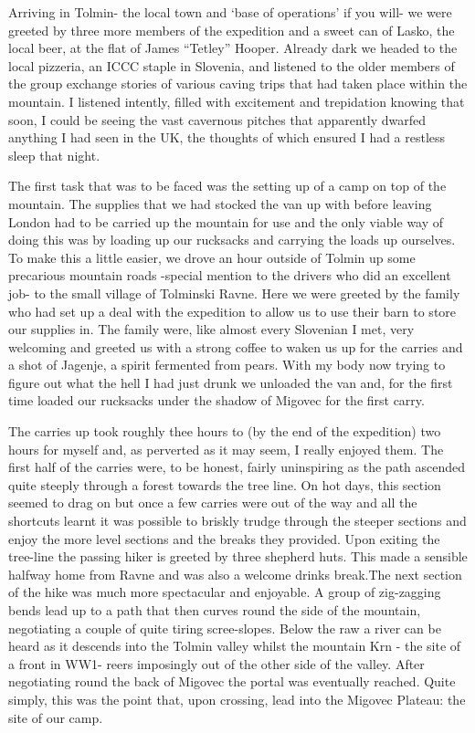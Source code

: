 Arriving in Tolmin- the local town and `base of operations' if you will-
we were greeted by three more members of the expedition and a sweet can
of Lasko, the local beer, at the flat of James ``Tetley'' Hooper.
Already dark we headed to the local pizzeria, an ICCC staple in
Slovenia, and listened to the older members of the group exchange
stories of various caving trips that had taken place within the
mountain. I listened intently, filled with excitement and trepidation
knowing that soon, I could be seeing the vast cavernous pitches that
apparently dwarfed anything I had seen in the UK, the thoughts of which
ensured I had a restless sleep that night.

The first task that was to be faced was the setting up of a camp on top
of the mountain. The supplies that we had stocked the van up with before
leaving London had to be carried up the mountain for use and the only
viable way of doing this was by loading up our rucksacks and carrying
the loads up ourselves. To make this a little easier, we drove an hour
outside of Tolmin up some precarious mountain roads -special mention to
the drivers who did an excellent job- to the small village of Tolminski
Ravne. Here we were greeted by the family who had set up a deal with the
expedition to allow us to use their barn to store our supplies in. The
family were, like almost every Slovenian I met, very welcoming and
greeted us with a strong coffee to waken us up for the carries and a
shot of Jagenje, a spirit fermented from pears. With my body now trying
to figure out what the hell I had just drunk we unloaded the van and,
for the first time loaded our rucksacks under the shadow of Migovec for
the first carry.

The carries up took roughly thee hours to (by the end of the expedition)
two hours for myself and, as perverted as it may seem, I really enjoyed
them. The first half of the carries were, to be honest, fairly
uninspiring as the path ascended quite steeply through a forest towards
the tree line. On hot days, this section seemed to drag on but once a
few carries were out of the way and all the shortcuts learnt it was
possible to briskly trudge through the steeper sections and enjoy the
more level sections and the breaks they provided. Upon exiting the
tree-line the passing hiker is greeted by three shepherd huts. This made
a sensible halfway home from Ravne and was also a welcome drinks
break.The next section of the hike was much more spectacular and
enjoyable. A group of zig-zagging bends lead up to a path that then
curves round the side of the mountain, negotiating a couple of quite
tiring scree-slopes. Below the raw a river can be heard as it descends
into the Tolmin valley whilst the mountain Krn - the site of a front in
WW1- reers imposingly out of the other side of the valley. After
negotiating round the back of Migovec the portal was eventually reached.
Quite simply, this was the point that, upon crossing, lead into the
Migovec Plateau: the site of our camp.

